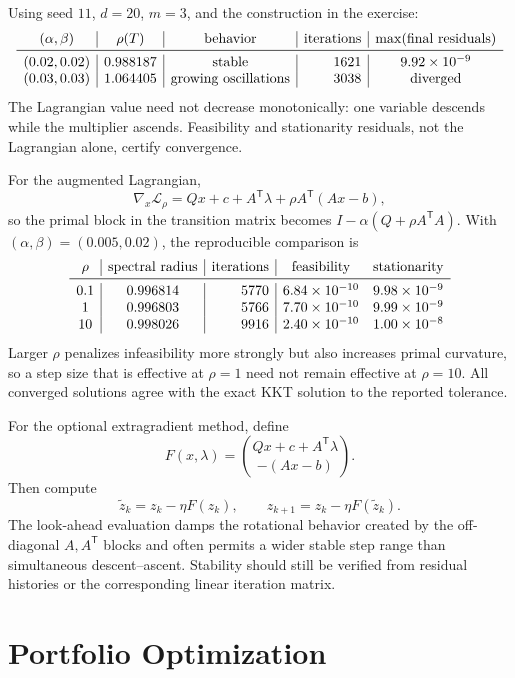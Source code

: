 \documentclass[10pt]{article}
\newcommand{\trans}{^{\mathsf T}}
\begin{document}
Using seed \(11\), \(d=20\), \(m=3\), and the construction in the exercise:
\[
\begin{array}{c|c|c|r|c}
(\alpha,\beta)&\rho(T)&\text{behavior}&\text{iterations}&
\max(\text{final residuals})\\ \midrule
(0.02,0.02)&0.988187&\text{stable}&1621&9.92\times10^{-9}\\
(0.03,0.03)&1.064405&\text{growing oscillations}&3038&\text{diverged}
\end{array}
\]
The Lagrangian value need not decrease monotonically: one variable descends
while the multiplier ascends. Feasibility and stationarity residuals, not the
Lagrangian alone, certify convergence.

For the augmented Lagrangian,
\[
\nabla_x\mathcal L_\rho
=Qx+c+A\trans\lambda+\rho A\trans(Ax-b),
\]
so the primal block in the transition matrix becomes
\(I-\alpha(Q+\rho A\trans A)\). With
\((\alpha,\beta)=(0.005,0.02)\), the reproducible comparison is
\[
\begin{array}{c|c|r|cc}
\rho&\text{spectral radius}&\text{iterations}&
\text{feasibility}&\text{stationarity}\\ \midrule
0.1&0.996814&5770&6.84\times10^{-10}&9.98\times10^{-9}\\
1&0.996803&5766&7.70\times10^{-10}&9.99\times10^{-9}\\
10&0.998026&9916&2.40\times10^{-10}&1.00\times10^{-8}
\end{array}
\]
Larger \(\rho\) penalizes infeasibility more strongly but also increases primal
curvature, so a step size that is effective at \(\rho=1\) need not remain
effective at \(\rho=10\). All converged solutions agree with the exact KKT
solution to the reported tolerance.

For the optional extragradient method, define
\[
F(x,\lambda)=
\binom{Qx+c+A\trans\lambda}{-(Ax-b)}.
\]
Then compute
\[
\widetilde z_k=z_k-\eta F(z_k),
\qquad
z_{k+1}=z_k-\eta F(\widetilde z_k).
\]
The look-ahead evaluation damps the rotational behavior created by the
off-diagonal \(A,A\trans\) blocks and often permits a wider stable step range
than simultaneous descent--ascent. Stability should still be verified from
residual histories or the corresponding linear iteration matrix.

\section{Portfolio Optimization}
\end{document}
